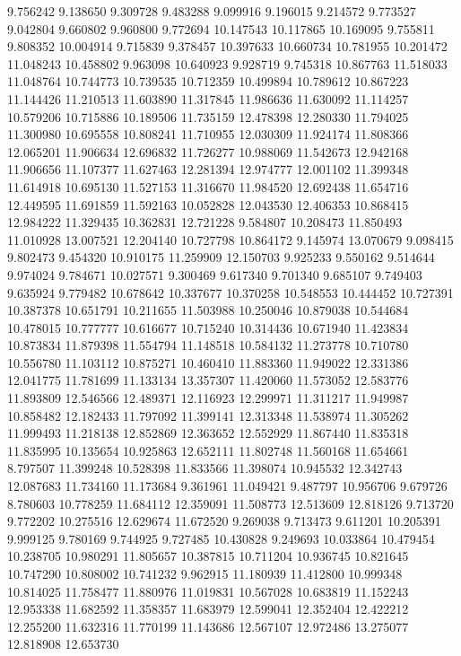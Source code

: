 9.756242
9.138650
9.309728
9.483288
9.099916
9.196015
9.214572
9.773527
9.042804
9.660802
9.960800
9.772694
10.147543
10.117865
10.169095
9.755811
9.808352
10.004914
9.715839
9.378457
10.397633
10.660734
10.781955
10.201472
11.048243
10.458802
9.963098
10.640923
9.928719
9.745318
10.867763
11.518033
11.048764
10.744773
10.739535
10.712359
10.499894
10.789612
10.867223
11.144426
11.210513
11.603890
11.317845
11.986636
11.630092
11.114257
10.579206
10.715886
10.189506
11.735159
12.478398
12.280330
11.794025
11.300980
10.695558
10.808241
11.710955
12.030309
11.924174
11.808366
12.065201
11.906634
12.696832
11.726277
10.988069
11.542673
12.942168
11.906656
11.107377
11.627463
12.281394
12.974777
12.001102
11.399348
11.614918
10.695130
11.527153
11.316670
11.984520
12.692438
11.654716
12.449595
11.691859
11.592163
10.052828
12.043530
12.406353
10.868415
12.984222
11.329435
10.362831
12.721228
9.584807
10.208473
11.850493
11.010928
13.007521
12.204140
10.727798
10.864172
9.145974
13.070679
9.098415
9.802473
9.454320
10.910175
11.259909
12.150703
9.925233
9.550162
9.514644
9.974024
9.784671
10.027571
9.300469
9.617340
9.701340
9.685107
9.749403
9.635924
9.779482
10.678642
10.337677
10.370258
10.548553
10.444452
10.727391
10.387378
10.651791
10.211655
11.503988
10.250046
10.879038
10.544684
10.478015
10.777777
10.616677
10.715240
10.314436
10.671940
11.423834
10.873834
11.879398
11.554794
11.148518
10.584132
11.273778
10.710780
10.556780
11.103112
10.875271
10.460410
11.883360
11.949022
12.331386
12.041775
11.781699
11.133134
13.357307
11.420060
11.573052
12.583776
11.893809
12.546566
12.489371
12.116923
12.299971
11.311217
11.949987
10.858482
12.182433
11.797092
11.399141
12.313348
11.538974
11.305262
11.999493
11.218138
12.852869
12.363652
12.552929
11.867440
11.835318
11.835995
10.135654
10.925863
12.652111
11.802748
11.560168
11.654661
8.797507
11.399248
10.528398
11.833566
11.398074
10.945532
12.342743
12.087683
11.734160
11.173684
9.361961
11.049421
9.487797
10.956706
9.679726
8.780603
10.778259
11.684112
12.359091
11.508773
12.513609
12.818126
9.713720
9.772202
10.275516
12.629674
11.672520
9.269038
9.713473
9.611201
10.205391
9.999125
9.780169
9.744925
9.727485
10.430828
9.249693
10.033864
10.479454
10.238705
10.980291
11.805657
10.387815
10.711204
10.936745
10.821645
10.747290
10.808002
10.741232
9.962915
11.180939
11.412800
10.999348
10.814025
11.758477
11.880976
11.019831
10.567028
10.683819
11.152243
12.953338
11.682592
11.358357
11.683979
12.599041
12.352404
12.422212
12.255200
11.632316
11.770199
11.143686
12.567107
12.972486
13.275077
12.818908
12.653730
